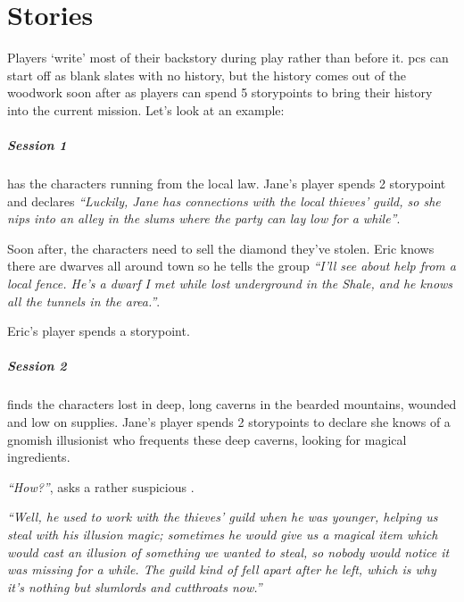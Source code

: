 \chapter{Stories}
\label{stories}


\begin{multicols}{2}

\noindent
Players `write' most of their backstory during play rather than before it.
\Glspl{pc} can start off as blank slates with no history, but the history comes out of the woodwork soon after as players can spend 5 \glspl{storypoint} to bring their history into the current mission.
Let's look at an example:

\paragraph{Session 1} has the characters running from the local law.
Jane's player spends 2 \gls{storypoint} and declares \textit{``Luckily, Jane has connections with the local thieves' guild, so she nips into an alley in the slums where the party can lay low for a while''}.

Soon after, the characters need to sell the diamond they've stolen.
Eric knows there are dwarves all around town so he tells the group \textit{``I'll see about help from a local fence.
He's a dwarf I met while lost underground in the Shale, and he knows all the tunnels in the area.''}.

Eric's player spends a \gls{storypoint}.

\paragraph{Session 2} finds the characters lost in deep, long caverns in the bearded mountains, wounded and low on supplies.
Jane's player spends 2 \glspl{storypoint} to declare she knows of a gnomish illusionist who frequents these deep caverns, looking for magical ingredients.

\textit{``How?''}, asks a rather suspicious .

\textit{``Well, he used to work with the thieves' guild when he was younger, helping us steal with his illusion magic; sometimes he would give us a magical item which would cast an illusion of something we wanted to steal, so nobody would notice it was missing for a while.
The guild kind of fell apart after he left, which is why it's nothing but slumlords and cutthroats now.''}


\end{multicols}
